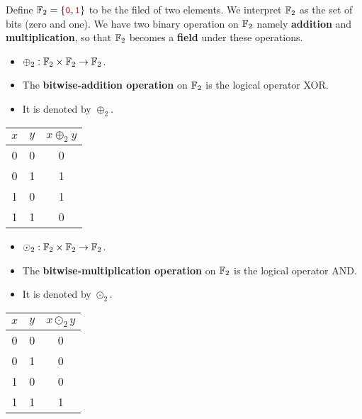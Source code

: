 \begin{note}
Define $\mathbb{F}_2=\set{\textcolor{red}{\texttt{0}},\textcolor{red}{\texttt{1}}}$ to be the filed of two elements. We interpret $\mathbb{F}_2$ as the set of bits (zero and one). We have two binary operation on $\mathbb{F}_2$ namely \textbf{addition} and \textbf{multiplication}, so that $\mathbb{F}_2$ becomes a \textbf{field} under these operations.
\begin{center}
\begin{minipage}{.48\textwidth}
\begin{itemize}
	\item $\oplus_2:\mathbb{F}_2\times\mathbb{F}_2\to\mathbb{F}_2$.
	\item The \textbf{bitwise-addition operation} on $\mathbb{F}_2$ is the logical operator XOR.
	\item It is denoted by $\oplus_2$.
\end{itemize}
\begin{center}
	\begin{tabular}{c|c||c}
		\toprule[1.2pt]
		$x$ & $y$ & $x\oplus_2 y$\\
		\hline
		0 & 0 & 0\\
		\hline
		0 & 1 & 1\\
		\hline
		1 & 0 & 1\\
		\hline
		1 & 1 & 0\\
		\bottomrule[1.2pt]
	\end{tabular}
\end{center}
\end{minipage}
\begin{minipage}{.48\textwidth}
\begin{itemize}
	\item $\odot_2:\mathbb{F}_2\times\mathbb{F}_2\to\mathbb{F}_2$.
	\item The \textbf{bitwise-multiplication operation} on $\mathbb{F}_2$ is the logical operator AND.
	\item It is denoted by $\odot_2$.
\end{itemize}
\begin{center}
	\begin{tabular}{c|c||c}
		\toprule[1.2pt]
		$x$ & $y$ & $x\odot_2 y$\\
		\hline
		0 & 0 & 0\\
		\hline
		0 & 1 & 0\\
		\hline
		1 & 0 & 0\\
		\hline
		1 & 1 & 1\\
		\bottomrule[1.2pt]
	\end{tabular}
\end{center}
\end{minipage}
\end{center}
\end{note}

